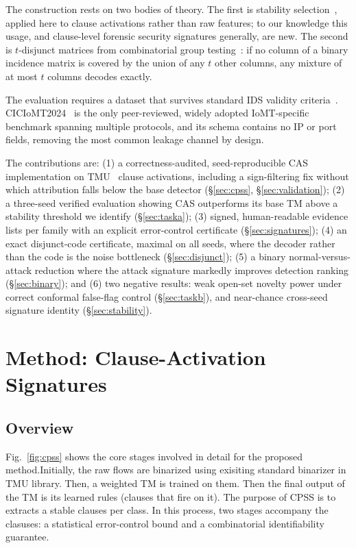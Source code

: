 \documentclass[conference]{IEEEtran}
\begin{document}
The construction rests on two bodies of theory. The first is stability
selection~\cite{meinshausen2010,shah2013}, applied here to clause
activations rather than raw features; to our knowledge this usage, and
clause-level forensic security signatures generally, are new. The second
is $t$-disjunct matrices from combinatorial group testing~\cite{du1993}:
if no column of a binary incidence matrix is covered by the union of any
$t$ other columns, any mixture of at most $t$ columns decodes exactly.

The evaluation requires a dataset that survives standard IDS validity
criteria~\cite{sommer2010,engelen2021,arp2022}. CICIoMT2024~\cite{dadkhah2024}
is the only peer-reviewed, widely adopted IoMT-specific benchmark spanning
multiple protocols, and its schema contains no IP or port fields, removing
the most common leakage channel by design.

The contributions are: (1) a correctness-audited, seed-reproducible CAS
implementation on TMU~\cite{tmu} clause activations, including a
sign-filtering fix without which attribution falls below the base detector
(\S\ref{sec:cpss}, \S\ref{sec:validation}); (2) a three-seed verified
evaluation showing CAS outperforms its base TM above a stability threshold
we identify (\S\ref{sec:taska}); (3) signed, human-readable evidence lists
per family with an explicit error-control certificate
(\S\ref{sec:signatures}); (4) an exact disjunct-code certificate, maximal
on all seeds, where the decoder rather than the code is the noise
bottleneck (\S\ref{sec:disjunct}); (5) a binary normal-versus-attack
reduction where the attack signature markedly improves detection ranking
(\S\ref{sec:binary}); and (6) two negative results: weak open-set novelty
power under correct conformal false-flag control (\S\ref{sec:taskb}), and
near-chance cross-seed signature identity (\S\ref{sec:stability}).

\section{Method: Clause-Activation Signatures}
\subsection{Overview}
Fig.~\ref{fig:cpss} shows the core stages involved in
detail for the proposed method.Initially, the raw flows are binarized using exisiting standard binarizer in TMU library. Then, a weighted TM is trained on them. Then the final output of the TM is its learned rules (clauses that fire on it). The purpose of CPSS is to extracts a stable
clauses per class. In this process, two stages accompany
the clasuses: a statistical error-control bound and a combinatorial
identifiability guarantee.
\end{document}
